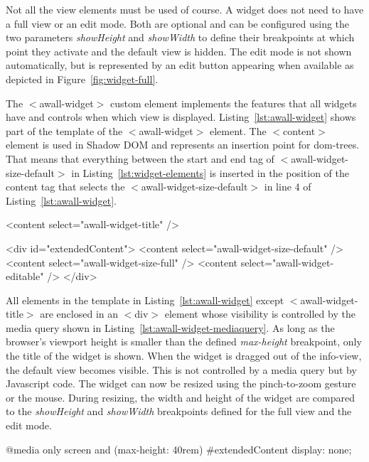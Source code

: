 \documentclass{sigchi}
\begin{document}
Not all the view elements must be used of course.
A widget does not need to have a full view or an edit mode.
Both are optional and can be configured using the two parameters \textit{showHeight} and \textit{showWidth} to define their breakpoints at which point they activate and the default view is hidden.
The edit mode is not shown automatically, but is represented by an edit button appearing when available as depicted in Figure~\ref{fig:widget-full}.


The $<$awall-widget$>$ custom element implements the features that all widgets have and controls when which view is displayed.
Listing~\ref{lst:awall-widget} shows part of the template of the $<$awall-widget$>$ element.
The $<$content$>$ element is used in Shadow DOM and represents an insertion point for \gls{dom}-trees.
That means that everything between the start and end tag of $<$awall-widget-size-default$>$ in Listing~\ref{lst:widget-elements} is inserted in the position of the content tag that selects the $<$awall-widget-size-default$>$ in line 4 of Listing~\ref{lst:awall-widget}.


\begin{code}[caption={Part of the $<$awall-widget$>$'s template using insertion points for the different HTML tags.},label=lst:awall-widget]
<content select="awall-widget-title" />

<div id="extendedContent">
  <content select="awall-widget-size-default" />
  <content select="awall-widget-size-full" />
  <content select="awall-widget-editable" />
</div>
\end{code}


All elements in the template in Listing~\ref{lst:awall-widget} except $<$awall-widget-title$>$ are enclosed in an $<$div$>$ element whose visibility is controlled by the media query shown in Listing~\ref{lst:awall-widget-mediaquery}.
As long as the browser's viewport height is smaller than the defined \textit{max-height} breakpoint, only the title of the widget is shown.
When the widget is dragged out of the info-view, the default view becomes visible. This is not controlled by a media query but by Javascript code.
The widget can now be resized using the pinch-to-zoom gesture or the mouse.
During resizing, the width and height of the widget are compared to the \textit{showHeight} and \textit{showWidth} breakpoints defined for the full view and the edit mode.

\begin{code}[caption={Media Query hiding all the views except the title when the screen is small enough.},label=lst:awall-widget-mediaquery]
@media only screen and (max-height: 40rem) {
  #extendedContent {
    display: none;
  }
}
\end{code}
\end{document}
